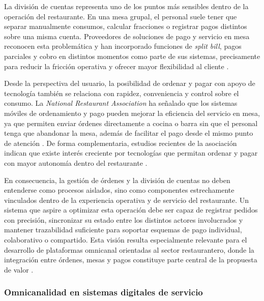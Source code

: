 \documentclass[12pt]{report}
\begin{document}
La división de cuentas representa uno de los puntos más sensibles dentro de la operación del restaurante. En una mesa grupal, el personal suele tener que separar manualmente consumos, calcular fracciones o registrar pagos distintos sobre una misma cuenta. Proveedores de soluciones de pago y servicio en mesa reconocen esta problemática y han incorporado funciones de \textit{split bill}, pagos parciales y cobro en distintos momentos como parte de sus sistemas, precisamente para reducir la fricción operativa y ofrecer mayor flexibilidad al cliente \cite{lightspeed_tableside_2024,lightspeed_restaurant_payments,lightspeed_tableservice_2021}.

Desde la perspectiva del usuario, la posibilidad de ordenar y pagar con apoyo de tecnología también se relaciona con rapidez, conveniencia y control sobre el consumo. La \textit{National Restaurant Association} ha señalado que los sistemas móviles de ordenamiento y pago pueden mejorar la eficiencia del servicio en mesa, ya que permiten enviar órdenes directamente a cocina o barra sin que el personal tenga que abandonar la mesa, además de facilitar el pago desde el mismo punto de atención \cite{nra_mobile_order_systems_2025}. De forma complementaria, estudios recientes de la asociación indican que existe interés creciente por tecnologías que permitan ordenar y pagar con mayor autonomía dentro del restaurante \cite{nra_tech_landscape_2024,nra_automated_ordering_payment_2024}.

En consecuencia, la gestión de órdenes y la división de cuentas no deben entenderse como procesos aislados, sino como componentes estrechamente vinculados dentro de la experiencia operativa y de servicio del restaurante. Un sistema que aspire a optimizar esta operación debe ser capaz de registrar pedidos con precisión, sincronizar su estado entre los distintos actores involucrados y mantener trazabilidad suficiente para soportar esquemas de pago individual, colaborativo o compartido. Esta visión resulta especialmente relevante para el desarrollo de plataformas omnicanal orientadas al sector restaurantero, donde la integración entre órdenes, mesas y pagos constituye parte central de la propuesta de valor \cite{square_restaurant_pos_2025,toast_kds_2026,lightspeed_restaurant_payments}.

\subsubsection{Omnicanalidad en sistemas digitales de servicio}
\end{document}
